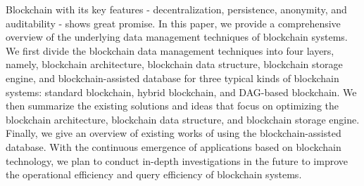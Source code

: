 \documentclass[acmsmall]{acmart}
\begin{document}
Blockchain with its key features - decentralization, persistence, anonymity, and auditability - shows great promise. In this paper, we provide a comprehensive overview of the underlying data management techniques of blockchain systems. We first divide the blockchain data management techniques into four layers, namely, blockchain architecture, blockchain data structure, blockchain storage engine, and blockchain-assisted database for three typical kinds of blockchain systems: standard blockchain, hybrid blockchain, and DAG-based blockchain.
We then summarize the existing solutions and ideas that focus on optimizing the blockchain architecture, blockchain data structure, and blockchain storage engine.
Finally, we give an overview of existing works of using the blockchain-assisted database. With the continuous emergence of applications based on blockchain technology, we plan to conduct in-depth investigations in the future to improve the operational efficiency and query efficiency of blockchain systems.





\end{document}
